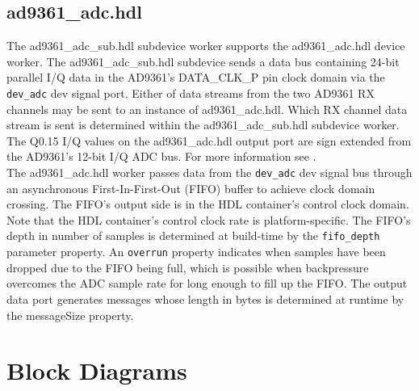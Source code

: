 \documentclass{article}
\def\comp{ad9361\_adc}
\begin{document}
\subsection*{\comp.hdl}
The ad9361\_adc\_sub.hdl subdevice worker supports the \comp{}.hdl device worker. The ad9361\_adc\_sub.hdl subdevice sends a data bus containing 24-bit parallel I/Q data in the AD9361's DATA\_CLK\_P pin clock domain via the \verb+dev_adc+ dev signal port. Either of data streams from the two AD9361 RX channels  may be sent to an instance of \comp{}.hdl. Which RX channel data stream is sent is determined within the ad9361\_adc\_sub.hdl subdevice worker. The Q0.15 I/Q values on the \comp{}.hdl output port are sign extended from the AD9361's 12-bit I/Q ADC bus. For more information see \cite{adc_sub_comp_datasheet}. \\
The \comp{}.hdl worker passes data from the \verb+dev_adc+ dev signal bus  through an asynchronous First-In-First-Out (FIFO) buffer to achieve clock domain crossing. The FIFO's output side is in the HDL container's control clock domain. Note that the HDL container's control clock rate is platform-specific. The FIFO's depth in number of samples is determined at build-time by the \verb+fifo_depth+ parameter property. An \verb+overrun+ property indicates when samples have been dropped due to the FIFO being full, which is possible when backpressure overcomes the ADC sample rate for long enough to fill up the FIFO. The output data port generates messages whose length in bytes is determined at runtime by the messageSize property.
\section*{Block Diagrams}
\end{document}
